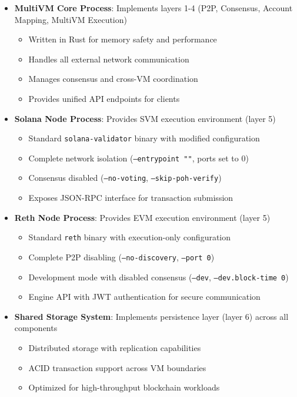 \documentclass[11pt,a4paper]{article}
\begin{document}
\begin{itemize}
    \item \textbf{MultiVM Core Process}: Implements layers 1-4 (P2P, Consensus, Account Mapping, MultiVM Execution)
    \begin{itemize}
        \item Written in Rust for memory safety and performance
        \item Handles all external network communication
        \item Manages consensus and cross-VM coordination
        \item Provides unified API endpoints for clients
    \end{itemize}
    \item \textbf{Solana Node Process}: Provides SVM execution environment (layer 5)
    \begin{itemize}
        \item Standard \texttt{solana-validator} binary with modified configuration
        \item Complete network isolation (\texttt{--entrypoint ""}, ports set to 0)
        \item Consensus disabled (\texttt{--no-voting}, \texttt{--skip-poh-verify})
        \item Exposes JSON-RPC interface for transaction submission
    \end{itemize}
    \item \textbf{Reth Node Process}: Provides EVM execution environment (layer 5)
    \begin{itemize}
        \item Standard \texttt{reth} binary with execution-only configuration
        \item Complete P2P disabling (\texttt{--no-discovery}, \texttt{--port 0})
        \item Development mode with disabled consensus (\texttt{--dev}, \texttt{--dev.block-time 0})
        \item Engine API with JWT authentication for secure communication
    \end{itemize}
    \item \textbf{Shared Storage System}: Implements persistence layer (layer 6) across all components
    \begin{itemize}
        \item Distributed storage with replication capabilities
        \item ACID transaction support across VM boundaries
        \item Optimized for high-throughput blockchain workloads
    \end{itemize}
\end{itemize}
\end{document}
